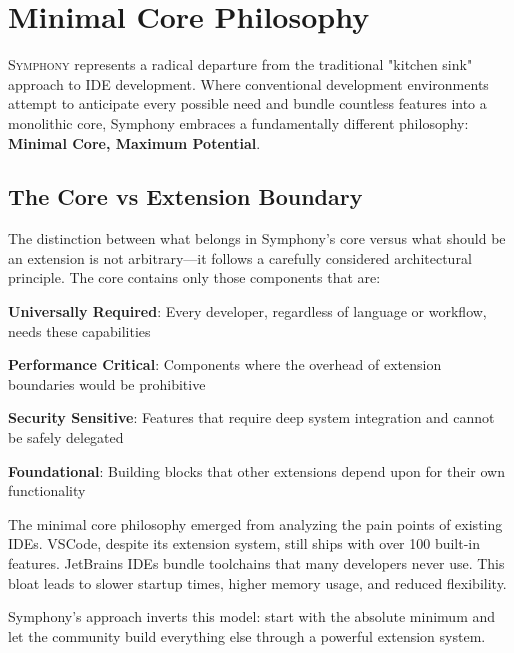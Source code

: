 
\section*{Minimal Core Philosophy}

\vspace{0.5cm}
\lettrine{S}{ymphony} represents a radical departure from the traditional "kitchen sink" approach to IDE development. Where conventional development environments attempt to anticipate every possible need and bundle countless features into a monolithic core, Symphony embraces a fundamentally different philosophy: \textbf{Minimal Core, Maximum Potential}.

\vspace{0.5cm}
\subsection*{The Core vs Extension Boundary}

The distinction between what belongs in Symphony's core versus what should be an extension is not arbitrary—it follows a carefully considered architectural principle. The core contains only those components that are:

\begin{compactlist}
    \item \textbf{Universally Required}: Every developer, regardless of language or workflow, needs these capabilities
    \item \textbf{Performance Critical}: Components where the overhead of extension boundaries would be prohibitive
    \item \textbf{Security Sensitive}: Features that require deep system integration and cannot be safely delegated
    \item \textbf{Foundational}: Building blocks that other extensions depend upon for their own functionality
\end{compactlist}

\begin{infobox}[title=Architectural Decision Rationale]
The minimal core philosophy emerged from analyzing the pain points of existing IDEs. VSCode, despite its extension system, still ships with over 100 built-in features. JetBrains IDEs bundle toolchains that many developers never use. This bloat leads to slower startup times, higher memory usage, and reduced flexibility.

Symphony's approach inverts this model: start with the absolute minimum and let the community build everything else through a powerful extension system.
\end{infobox}

